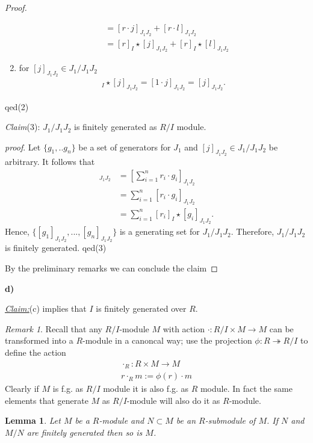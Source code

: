 \documentclass{article}
\newcommand{\claim}
{\underline{\textit{Claim:}}\hspace{0,2cm}}
\newcommand{\subclaim}[1]
{

	\vspace*{0,2cm}
	\textit{Claim}({#1}):
}
\newcommand{\subqed}[1]{\hfill\textsf{qed}({#1})}
\newcommand{\subproof}{

\noindent\textit{proof}.\hspace{0,1cm}
}
\newcommand{\teilaufgabe}[1]{
{       

	\noindent\hspace*{0,1 cm}\textbf{#1)}
}
}
\theoremstyle{definition}
\theoremstyle{plain}
\newtheorem{lem}[thm]{Lemma}
\theoremstyle{remark}
\newtheorem*{silentremark}{Remark}
\begin{document}
\begin{proof}
\begin{enumerate}
\begin{align}
								&= [r\cdot j]_{J_1J_2}+[r\cdot l]_{J_1J_2} \\
								&= [r]_I\star[j]_{J_1J_2}+[r]_I\star[l]_{J_1J_2}
			\end{align}
		\item for $[j]_{J_1J_2}\in J_1/J_1J_2$
			\begin{align}
				[1]_I \star [j]_{J_1J_2} = [1\cdot j]_{J_1J_2} = [j]_{J_1J_2}.
			\end{align}
	\end{enumerate}
	\subqed2
	\subclaim3 $J_1/J_1J_2$ is finitely generated as $R/I$ module.
	\subproof Let $\{g_1,..g_n\}$ be a set of generators for $J_1$ and $[j]_{J_1J_2}\in J_1/J_1J_2$ be arbitrary. It follows that 
	\begin{align}
		[j]_{J_1J_2}&=[\sum_{i=1}^{n}r_i\cdot g_i]_{J_1J_2}\\
			    &= \sum_{i=1}^{n}[r_i\cdot g_i]_{J_1J_2}\\
			    &=\sum_{i=1}^{n}[r_i]_I\star[g_i]_{J_1J_2}.
	\end{align}
	Hence, $\{[g_1]_{J_1J_2},...,[g_n]_{J_1J_2}\}$ is a generating set for $J_1/J_1J_2$. Therefore, $J_1/J_1J_2$ is finitely generated. \subqed3

	By the preliminary remarks we can conclude the claim
\end{proof}
\teilaufgabe{d} \claim (c) implies that $I$ is finitely generated over $R$.
\begin{silentremark}
	Recall that any $R/I$-module $M$ with action $\cdot: R/I\times M\rightarrow M$ can be transformed into a $R$-module in a canoncal way; use the projection $\phi:R\twoheadrightarrow R/I$ to define the action
	\begin{align}
		\cdot_R: R \times M \rightarrow M \\
		r\cdot_R m := \phi(r)\cdot m
	\end{align}
	Clearly if $M$ is f.g. as $R/I$ module it is also f.g. as $R$ module. In fact the same elements that generate $M$ as $R/I$-module will also do it as $R$-module.
\end{silentremark}
\begin{lem}
	Let $M$ be a $R$-module and $N\subset M$ be an $R$-submodule of $M$. 
	If $N$ and $M/N$ are finitely generated then so is $M$.
\end{lem}
\end{document}
